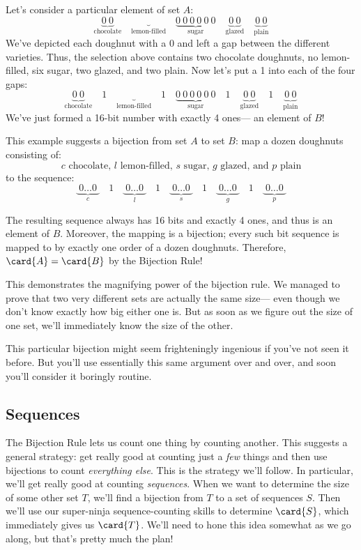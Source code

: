 Let's consider a particular element of set $A$:
%
\[
\underbrace{0\ 0}_{\text{chocolate}} \quad
\underbrace{}_{\text{lemon-filled}} \quad
\underbrace{0\ 0\ 0\ 0\ 0\ 0}_{\text{sugar}} \quad
\underbrace{0\ 0}_{\text{glazed}} \quad
\underbrace{0\ 0}_{\text{plain}}
\]
%
We've depicted each doughnut with a $0$ and left a gap between the
different varieties.  Thus, the selection above contains two chocolate
doughnuts, no lemon-filled, six sugar, two glazed, and two plain.  Now
let's put a 1 into each of the four gaps:
%
\[
\underbrace{0\ 0}_{\text{chocolate}} \quad 1 \quad
\underbrace{}_{\text{lemon-filled}} \quad 1 \quad
\underbrace{0\ 0\ 0\ 0\ 0\ 0}_{\text{sugar}} \quad 1 \quad
\underbrace{0\ 0}_{\text{glazed}} \quad 1 \quad
\underbrace{0\ 0}_{\text{plain}}
\]
%
We've just formed a 16-bit number with exactly 4 ones--- an element of
$B$!

This example suggests a bijection from set $A$ to set $B$: map a dozen
doughnuts consisting of:
%
\[
\text{$c$ chocolate, $l$ lemon-filled, $s$ sugar, $g$ glazed, and $p$ plain}
\]
%
to the sequence:
%
\[
\underbrace{\ 0 \ldots 0\ }_{\text{$c$}} \quad 1 \quad
\underbrace{\ 0 \ldots 0\ }_{\text{$l$}} \quad 1 \quad
\underbrace{\ 0 \ldots 0\ }_{\text{$s$}} \quad 1 \quad
\underbrace{\ 0 \ldots 0\ }_{\text{$g$}} \quad 1 \quad
\underbrace{\ 0 \ldots 0\ }_{\text{$p$}}
\]

The resulting sequence always has 16 bits and exactly 4
ones, and thus is an element of $B$.  Moreover, the mapping is a
bijection; every such bit sequence is mapped to by exactly one order
of a dozen doughnuts.  Therefore, $\card{A} = \card{B}$ by the
Bijection Rule!

This demonstrates the magnifying power of the bijection rule.  We
managed to prove that two very different sets are actually the same
size--- even though we don't know exactly how big either one is.  But
as soon as we figure out the size of one set, we'll immediately know
the size of the other.

This particular bijection might seem frighteningly ingenious if you've
not seen it before.  But you'll use essentially this same argument
over and over, and soon you'll consider it boringly routine.

\subsection{Sequences}

The Bijection Rule lets us count one thing by counting another.  This
suggests a general strategy: get really good at counting just a
\textit{few} things and then use bijections to count \textit{everything
else}.  This is the strategy we'll follow.  In particular, we'll get
really good at counting \emph{sequences}.  When we want to determine the
size of some other set $T$, we'll find a bijection from $T$ to a set of
sequences $S$.  Then we'll use our super-ninja sequence-counting skills to
determine $\card{S}$, which immediately gives us $\card{T}$.  We'll need
to hone this idea somewhat as we go along, but that's pretty much the
plan!


